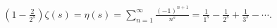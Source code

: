 \documentclass[preview]{standalone}
\begin{document}
\begin{align*}
{\displaystyle \left(1-{\frac {2}{2^{s}}}\right)\zeta (s)=\eta (s)=\sum _{n=1}^{\infty }{\frac {(-1)^{n+1}}{n^{s}}}={\frac {1}{1^{s}}}-{\frac {1}{2^{s}}}+{\frac {1}{3^{s}}}-\cdots .}
\end{align*}
\end{document}
